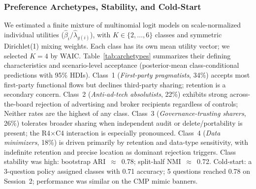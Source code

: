 \documentclass{eusset}
\begin{document}
\subsubsection{Preference Archetypes, Stability, and Cold-Start}
We estimated a finite mixture of multinomial logit models on scale-normalized individual utilities ($\hat{\beta}_i / \hat{\lambda}_{g(i)}$), with $K \in \{2,\ldots,6\}$ classes and symmetric Dirichlet(1) mixing weights. Each class has its own mean utility vector; we selected $K{=}4$ by WAIC. Table~\ref{tab:archetypes} summarizes their defining characteristics and scenario-level acceptance (posterior-mean class-conditional predictions with 95\% HDIs). Class~1 (\emph{First-party pragmatists}, 34\%) accepts most first-party functional flows but declines third-party sharing; retention is a secondary concern. Class~2 (\emph{Anti-ad-tech absolutists}, 22\%) exhibits strong across-the-board rejection of advertising and broker recipients regardless of controls; Neither rates are the highest of any class. Class~3 (\emph{Governance-trusting sharers}, 26\%) tolerates broader sharing when independent audit or delete/portability is present; the R4$\times$C4 interaction is especially pronounced. Class~4 (\emph{Data minimizers}, 18\%) is driven primarily by retention and data-type sensitivity, with indefinite retention and precise location as dominant rejection triggers. Class stability was high: bootstrap ARI~$\approx$~0.78; split-half NMI~$\approx$~0.72. Cold-start: a 3-question policy assigned classes with 0.71 accuracy; 5 questions reached 0.78 on Session~2; performance was similar on the CMP mimic banners.

\begin{table}[h]
  \centering
  \caption{Preference archetypes from scale-normalized latent-class mixture ($K{=}4$ by WAIC). Acceptance rates are posterior means [95\% HDI]. S1 = Service, identifiers, 30d, no controls; S3 = Brokers, sensitive, indefinite, no controls.}
  \label{tab:archetypes}
\end{table}
\end{document}
